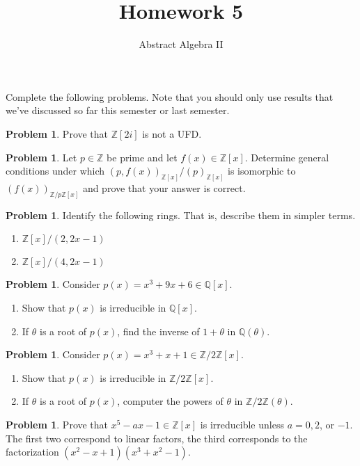 \documentclass[11pt]{scrartcl}
\theoremstyle{definition}
\newtheorem{problem}[theorem]{Problem}
\newcommand{\blankline}{\pagebreak[2]\vspace{.5\baselineskip}}
\begin{document}
\title{Homework 5}
\subtitle{Abstract Algebra II}
\date{}

\maketitle
\thispagestyle{fancy}

Complete the following problems. Note that you should only use results that we've discussed so far this semester or last semester.

%

\begin{problem}
Prove that $\mathbb{Z}[2i]$ is not a UFD.
\end{problem}

\begin{problem}
Let $p\in \mathbb{Z}$ be prime and let $f(x)\in \mathbb{Z}[x]$.  Determine general conditions under which $(p,f(x))_{\mathbb{Z}[x]}/(p)_{\mathbb{Z}[x]}$ is isomorphic to $(f(x))_{\mathbb{Z}/p\mathbb{Z}[x]}$ and prove that your answer is correct.
\end{problem}

\begin{problem}
Identify the following rings. That is, describe them in simpler terms.
\begin{enumerate}[label=\rm{(\alph*)}]
\item $\mathbb{Z}[x]/(2,2x-1)$
\item $\mathbb{Z}[x]/(4,2x-1)$
\end{enumerate}
\end{problem}

\begin{problem}
Consider $p(x)=x^3+9x+6\in\mathbb{Q}[x]$.
\begin{enumerate}[label=\rm{(\alph*)}]
\item Show that $p(x)$ is irreducible in $\mathbb{Q}[x]$.
\item If $\theta$ is a root of $p(x)$, find the inverse of $1+\theta$ in $\mathbb{Q}(\theta)$.
\end{enumerate}
\end{problem}

\begin{problem}
Consider $p(x)=x^3+x+1\in\mathbb{Z}/2\mathbb{Z}[x]$.
\begin{enumerate}[label=\rm{(\alph*)}]
\item Show that $p(x)$ is irreducible in $\mathbb{Z}/2\mathbb{Z}[x]$.
\item If $\theta$ is a root of $p(x)$, computer the powers of $\theta$ in $\mathbb{Z}/2\mathbb{Z}(\theta)$.
\end{enumerate}
\end{problem}

\begin{problem}
Prove that $x^5-ax-1\in\mathbb{Z}[x]$ is irreducible unless $a=0,2$, or $-1$.  The first two correspond to linear factors, the third corresponds to the factorization $(x^2-x+1)(x^3+x^2-1)$.
\end{problem}
\end{document}
